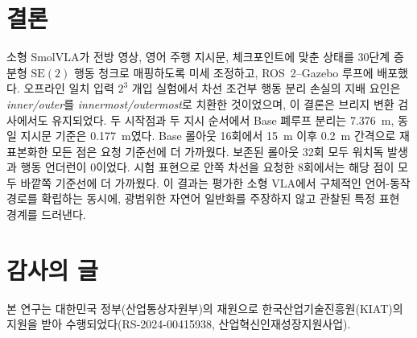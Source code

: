 \documentclass[letterpaper,conference]{IEEEtran}
\newcommand{\seTwo}{\mathrm{SE}(2)}
\begin{document}
\balance
\section{결론}
소형 SmolVLA가 전방 영상, 영어 주행 지시문, 체크포인트에 맞춘 상태를 30단계 증분형
$\seTwo$ 행동 청크로 매핑하도록 미세 조정하고, ROS~2--Gazebo 루프에 배포했다.
오프라인 일치 입력 $2^3$ 개입 실험에서 차선 조건부 행동 분리 손실의 지배 요인은
\emph{inner/outer}를 \emph{innermost/outermost}로 치환한 것이었으며, 이 결론은
브리지 변환 검사에서도 유지되었다. 두 시작점과 두 지시 순서에서 Base 폐루프 분리는
7.376~m, 동일 지시문 기준은 0.177~m였다. Base 롤아웃 16회에서 15~m 이후 0.2~m
간격으로 재표본화한 모든 점은 요청 기준선에 더 가까웠다. 보존된 롤아웃 32회 모두
워치독 발생과 행동 언더런이 0이었다. 시험 표현으로 안쪽 차선을 요청한 8회에서는 해당
점이 모두 바깥쪽 기준선에 더 가까웠다. 이 결과는 평가한 소형 VLA에서 구체적인
언어-동작 경로를 확립하는 동시에, 광범위한 자연어 일반화를 주장하지 않고 관찰된 특정
표현 경계를 드러낸다.

\section*{감사의 글}
본 연구는 대한민국 정부(산업통상자원부)의 재원으로 한국산업기술진흥원(KIAT)의
지원을 받아 수행되었다(RS-2024-00415938, 산업혁신인재성장지원사업).
\end{document}

